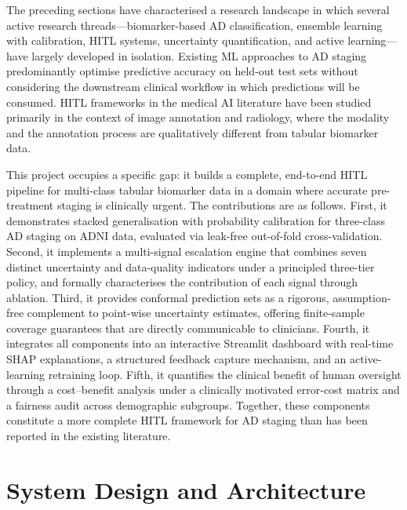 \documentclass[12pt, a4paper]{report}
\begin{document}
  The preceding sections have characterised a research landscape in which several
  active research threads---biomarker-based AD classification, ensemble learning with
  calibration, HITL systems, uncertainty quantification, and active learning---have
  largely developed in isolation. Existing ML approaches to AD staging predominantly
  optimise predictive accuracy on held-out test sets without considering the
  downstream clinical workflow in which predictions will be consumed. HITL frameworks
  in the medical AI literature have been studied primarily in the context of image
  annotation and radiology, where the modality and the annotation process are
  qualitatively different from tabular biomarker data.

  This project occupies a specific gap: it builds a complete, end-to-end HITL
  pipeline for multi-class tabular biomarker data in a domain where accurate
  pre-treatment staging is clinically urgent. The contributions are as follows.
  First, it demonstrates stacked generalisation with probability calibration for
  three-class AD staging on ADNI data, evaluated via leak-free out-of-fold
  cross-validation. Second, it implements a multi-signal escalation engine that
  combines seven distinct uncertainty and data-quality indicators under a principled
  three-tier policy, and formally characterises the contribution of each signal
  through ablation. Third, it provides conformal prediction sets as a rigorous,
  assumption-free complement to point-wise uncertainty estimates, offering finite-sample
  coverage guarantees that are directly communicable to clinicians. Fourth, it
  integrates all components into an interactive Streamlit dashboard with real-time
  SHAP explanations, a structured feedback capture mechanism, and an active-learning
  retraining loop. Fifth, it quantifies the clinical benefit of human oversight
  through a cost--benefit analysis under a clinically motivated error-cost matrix and
  a fairness audit across demographic subgroups. Together, these components constitute
  a more complete HITL framework for AD staging than has been reported in the
  existing literature.


  \chapter{System Design and Architecture}
  \label{chap:design}

\end{document}
